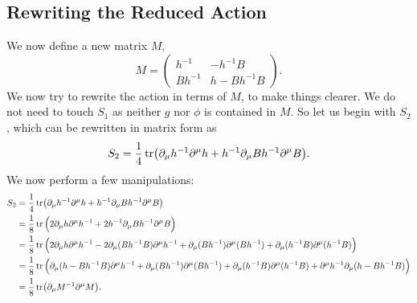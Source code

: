 \documentclass{article}
\begin{document}
\subsection{Rewriting the Reduced Action}
We now define a new matrix $M$,
\begin{equation}
    M = \begin{pmatrix}
        h^{-1} & -h^{-1}B \\ Bh^{-1} & h-Bh^{-1}B
    \end{pmatrix}.
\end{equation}
We now try to rewrite the action in terms of $M$, to make things clearer. We do not need to touch $S_1$ as neither $g$ nor $\phi$ is contained in $M$. So let us begin
with $S_2$, which
can be rewritten in matrix form as
\begin{equation*}
    S_2 = \frac{1}{4}\tr(\partial_{\mu}h^{-1}\partial^{\mu}h + h^{-1}\partial_\mu Bh^{-1}\partial^{\mu}B).
\end{equation*}
We now perform a few manipulations:
\begin{equation}
    \begin{aligned}
   S_2 &= \frac{1}{4}\tr(\partial_{\mu}h^{-1}\partial^{\mu}h + h^{-1}\partial_\mu B h^{-1}\partial^\mu B)\\
&=\frac{1}{8}\tr\Big(2\partial_\mu h\partial^\mu h^{-1}+2h^{-1}\partial_\mu B h^{-1}\partial^\mu B\Big)\\
&=\frac{1}{8}\tr\Big(2\partial_\mu h\partial^\mu h^{-1}-2\partial_\mu(Bh^{-1}B)\partial^\mu h^{-1}+\partial_\mu(Bh^{-1})\partial^\mu(Bh^{-1})+\partial_\mu(h^{-1}B)\partial^\mu(h^{-1}B)\Big)\\
&=\frac{1}{8}\tr\Big(\partial_\mu(h-Bh^{-1}B)\partial^\mu h^{-1}+\partial_\mu(Bh^{-1})\partial^\mu(Bh^{-1})+\partial_\mu(h^{-1}B)\partial^\mu(h^{-1}B)+\partial^\mu h^{-1}\partial_\mu(h-Bh^{-1}B)\Big)\\
& = \frac{1}{8}\tr(\partial_\mu M^{-1}\partial^\mu M).
    \end{aligned}
\end{equation}
\end{document}
